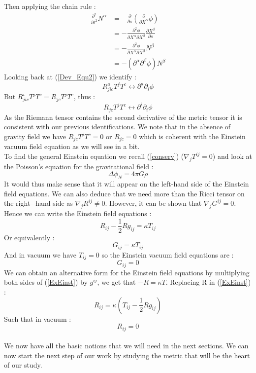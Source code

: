 \documentclass[a4paper,12pt]{article}
\theoremstyle{definition}
\begin{document}
Then applying the chain rule :
\begin{equation}
\begin{split}
	\frac{\partial^2}{\partial t^2}N^\alpha&=-\frac{\partial}{\partial s}(\frac{\partial}{\partial X^\alpha}\phi)\\
	&=-\frac{\partial^2\phi}{\partial X^\alpha\partial X^\beta}\frac{\partial X^\beta}{\partial s}\\
	&=-\frac{\partial^2\phi}{\partial X^\alpha\partial X^\beta}N^\beta\\
	&=-(\partial^\alpha \partial^\beta \phi)N^\beta
\end{split}
\end{equation}
Looking back at (\ref{Dev_Equ2}) we identify :
\begin{equation}
	R_{jic}^aT^jT^c\longleftrightarrow \partial^a \partial_i \phi
\end{equation}
But $R_{jic}^iT^jT^c=R_{jc}T^jT^c$, thus :
\begin{equation}
	R_{jc}T^jT^c\longleftrightarrow \partial^i \partial_i \phi
\end{equation}
As the Riemann tensor contains the second derivative of the metric tensor it is consistent with our previous identifications.
We note that in the absence of gravity field we have $R_{jc}T^jT^c=0$ or $R_{jc}=0$ which is coherent with the Einstein vacuum field equation as we will see in a bit.\\
To find the general Einstein equation we recall (\ref{conserv}) ($\nabla_j T^{ij}=0$) and look at the Poisson's equation for the gravitational field :
\begin{equation}
	\Delta\phi_N=4\pi G\rho
\end{equation}
It would thus make sense that it will appear on the left-hand side of the Einstein field equations.
We can also deduce that we need more than the Ricci tensor on the right$-$hand side as $\nabla_j R^{ij}\ne0$.
However, it can be shown that $\nabla_j G^{ij}=0$.
Hence we can write the Einstein field equations :
\begin{equation}\label{ExEinst}
	R_{ij}-\frac{1}{2}Rg_{ij}=\kappa T_{ij}
\end{equation}
Or equivalently :
\begin{equation}
	G_{ij}=\kappa T_{ij}
\end{equation}
And in vacuum we have $T_{ij}=0$ so the Einstein vacuum field equations are :
\begin{equation}
	G_{ij}=0
\end{equation}
We can obtain an alternative form for the Einstein field equations by multiplying both sides of (\ref{ExEinst}) by $g^{ij}$, we get that $-R=\kappa T$.
Replacing R in (\ref{ExEinst}) :
\begin{equation}
	R_{ij}=\kappa(T_{ij}-\frac{1}{2}Rg_{ij})
\end{equation}
Such that in vacuum :
\begin{equation}
	R_{ij}=0
\end{equation}
\\We now have all the basic notions that we will need in the next sections.
We can now start the next step of our work by studying the metric that will be the heart of our study.
\end{document}
